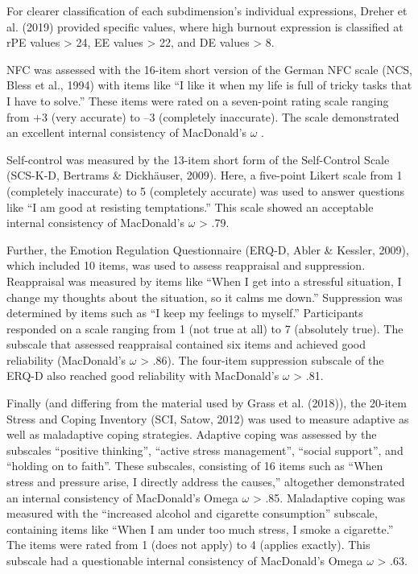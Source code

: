 \documentclass[
  man]{apa6}
\begin{document}
For clearer classification of each subdimension's individual expressions, Dreher et al. (2019) provided specific values, where high burnout expression is classified at rPE values \textgreater{} 24, EE values \textgreater{} 22, and DE values \textgreater{} 8.

NFC was assessed with the 16-item short version of the German NFC scale (NCS, Bless et al., 1994) with items like ``I like it when my life is full of tricky tasks that I have to solve.'' These items were rated on a seven-point rating scale ranging from +3 (very accurate) to --3 (completely inaccurate).
The scale demonstrated an excellent internal consistency of MacDonald's \(\omega\) .

Self-control was measured by the 13-item short form of the Self-Control Scale (SCS-K-D, Bertrams \& Dickhäuser, 2009).
Here, a five-point Likert scale from 1 (completely inaccurate) to 5 (completely accurate) was used to answer questions like ``I am good at resisting temptations.''
This scale showed an acceptable internal consistency of MacDonald's \(\omega\) \textgreater{} .79.

Further, the Emotion Regulation Questionnaire (ERQ-D, Abler \& Kessler, 2009), which included 10 items, was used to assess reappraisal and suppression. Reappraisal was measured by items like ``When I get into a stressful situation, I change my thoughts about the situation, so it calms me down.''
Suppression was determined by items such as ``I keep my feelings to myself.''
Participants responded on a scale ranging from 1 (not true at all) to 7 (absolutely true).
The subscale that assessed reappraisal contained six items and achieved good reliability (MacDonald's \(\omega\) \textgreater{} .86).
The four-item suppression subscale of the ERQ-D also reached good reliability with MacDonald's \(\omega\) \textgreater{} .81.

Finally (and differing from the material used by Grass et al. (2018)), the 20-item Stress and Coping Inventory (SCI, Satow, 2012) was used to measure adaptive as well as maladaptive coping strategies.
Adaptive coping was assessed by the subscales ``positive thinking'', ``active stress management'', ``social support'', and ``holding on to faith''.
These subscales, consisting of 16 items such as ``When stress and pressure arise, I directly address the causes,'' altogether demonstrated an internal consistency of MacDonald's Omega \(\omega\) \textgreater{} .85.
Maladaptive coping was measured with the ``increased alcohol and cigarette consumption'' subscale, containing items like ``When I am under too much stress, I smoke a cigarette.'' The items were rated from 1 (does not apply) to 4 (applies exactly).
This subscale had a questionable internal consistency of MacDonald's Omega \(\omega\) \textgreater{} .63.
\end{document}
